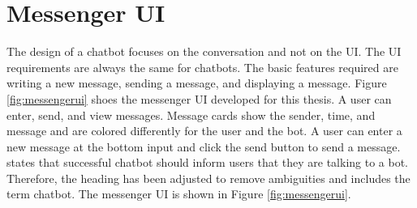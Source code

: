 \section{Messenger UI}
The design of a chatbot focuses on the conversation and not on the UI.
The UI requirements are always the same for chatbots.
The basic features required are writing a new message, sending a message, and displaying a message.
 Figure \ref{fig:messengerui} shoes the messenger UI  developed for this thesis. 
A user can enter, send, and view messages.
Message cards show the sender, time, and message and are colored differently for the user and the bot.
A user can enter a new message at the bottom input and click the send button to send a message.
\citet{brandtzaeg2018chatbots} states that successful chatbot should inform users that they are talking to a bot.
Therefore, the heading has been adjusted to remove ambiguities and includes the term chatbot.
The messenger UI is shown in Figure \ref{fig:messengerui}. 
